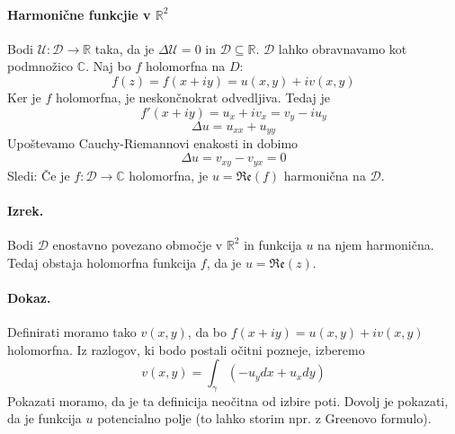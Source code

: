 \documentclass[a4paper]{article}
\newcommand{\C}{\mathbb{C}}
\newcommand{\R}{\mathbb{R}}
\newcommand{\fn}[3]{{#1}\colon {#2} \rightarrow {#3}}
\begin{document}
\paragraph{Harmonične funkcjie v $\R^2$} Bodi $\fn{\mathcal{U}}{\mathcal{D}}{\R}$ taka, da je $\Delta \mathcal{U} = 0$ in $\mathcal{D} \subseteq \R$.
$\mathcal{D}$ lahko obravnavamo kot podmnožico $\C$. Naj bo $f$ holomorfna na $D$:
$$f(z) = f(x + iy) = u(x, y) + iv(x, y)$$
Ker je $f$ holomorfna, je neskončnokrat odvedljiva. Tedaj je $$f'(x+iy) = u_x + iv_x = v_y -iu_y$$
$$\Delta u = u_{xx} + u_{yy}$$
Upoštevamo Cauchy-Riemannovi enakosti in dobimo
$$\Delta u = v_{xy} - v_{yx} = 0$$
Sledi: Če je $\fn{f}{\mathcal{D}}{\C}$ holomorfna, je $u = \mathfrak{Re}(f)$ harmonična na $\mathcal{D}$.
\paragraph{Izrek.} Bodi $\mathcal{D}$ enostavno povezano območje v $\R^2$ in funkcija $u$ na njem harmonična. Tedaj obstaja holomorfna funkcija $f$, da je $u = \mathfrak{Re}(z)$.
\paragraph{Dokaz.} Definirati moramo tako $v(x, y)$, da bo $f(x + iy) = u(x, y) + iv(x, y)$ holomorfna. Iz razlogov, ki bodo postali očitni pozneje, izberemo
$$v(x, y) = \int_{\gamma} (-u_y dx + u_x dy)$$
Pokazati moramo, da je ta definicija neočitna od izbire poti. Dovolj je pokazati, da je funkcija $u$ potencialno polje (to lahko storim npr. z Greenovo formulo).
\end{document}
